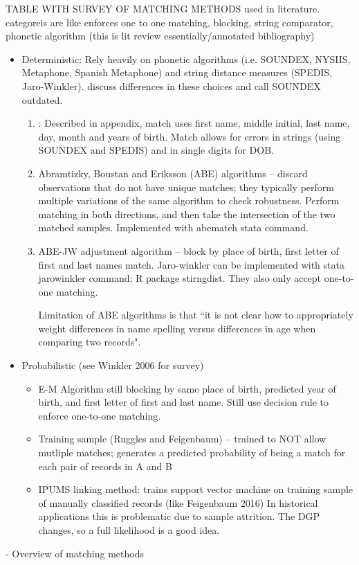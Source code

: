 \documentclass[12pt]{article}
\begin{document}
TABLE WITH SURVEY OF MATCHING METHODS used in literature.   categoreis are like enforces one to one matching, blocking, string comparator, phonetic algorithm (this is lit review essentially/annotated bibliography) 
\begin{itemize}
\item Deterministic:  Rely heavily on phonetic algorithms (i.e. SOUNDEX, NYSIIS, Metaphone, Spanish Metaphone) and string distance measures (SPEDIS, Jaro-Winkler).    \cite{abe2019} discuss differences in these choices and call SOUNDEX outdated.
\begin{enumerate}
\item \cite{aizer2016}:  Described in appendix, match uses first name, middle initial, last name, day, month and years of birth.   Match allows for errors in strings (using SOUNDEX and SPEDIS) and in single digits for DOB. 
\item Abramtizky, Boustan and Eriksson (ABE) algorithms -- discard observations that do not have unique matches; they typically perform multiple variations of the same algorithm to check robustness.  Perform matching in both directions, and then take the intersection of the two matched samples.  Implemented with abematch stata command. 
\item ABE-JW adjustment algorithm -- block by place of birth, first letter of first and last names match.  Jaro-winkler can be implemented with stata jarowinkler command; R package stirngdist.  They also only accept one-to-one matching. 

Limitation of ABE algorithms is that ``it is not clear how to
appropriately weight differences in name spelling versus differences in age when comparing two records".  
\end{enumerate}
\item Probabilistic  (see Winkler 2006 for survey)
\begin{itemize}
\item E-M Algorithm \cite{arp2018} still blocking by same place of birth, predicted year of birth, and first letter of first and last name.  Still use decision rule to enforce one-to-one matching. 
\item Training sample (Ruggles and Feigenbaum) -- trained to NOT allow mutliple matches; generates a predicted probability of being a match for each pair of records in A and B
\item IPUMS linking method:  trains support vector machine on training sample of manually classified records (like Feigenbaum 2016)  In historical applications this is problematic due to sample attrition.  The DGP changes, so a full likelihood is a good idea. 
\end{itemize}
\end{itemize}
- Overview of matching methods
\end{document}

